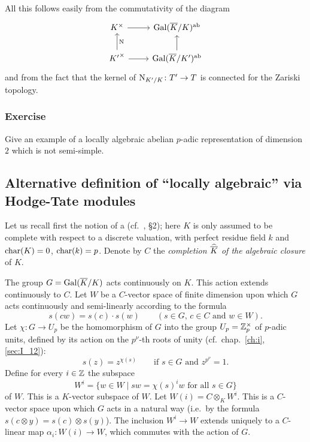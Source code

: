 All this follows easily from the commutativity of the diagram
\dpage
\[\begin{tikzcd}
	{K^\times} & {\abcl{\Gal(\algcl K/K)}} \\
	{{K'}^\times} & {\abcl{\Gal(\algcl K/K')}}
	\arrow[from=1-1, to=1-2]
	\arrow["\Nm"', from=2-1, to=1-1]
	\arrow[from=2-1, to=2-2]
	\arrow[from=2-2, to=1-2]
\end{tikzcd}\]
and from the fact that the kernel of $\operatorname{N}_{K'/K} \colon T' \to T$ is connected
for the Zariski topology.

\subsubsection*{Exercise}
Give an example of a locally algebraic abelian $p$-adic representation of
dimension $2$ which is not semi-simple.

\subsection{Alternative definition of ``locally algebraic'' via Hodge-Tate
modules}
\label{sec:III_12}
Let us recall first the notion of a  (cf.\ \cite{27},
\S 2); here $K$ is only assumed to be complete with respect to a discrete
valuation, with perfect residue field $k$ and $\operatorname{char}(K) = 0$, $\operatorname{char}(k) = p$.
Denote by $C$ the \emph{completion $\widehat{\overline{K}}$ of the algebraic
closure} of $K$.

The group $G = \operatorname{Gal}(\overline{K}/K)$ acts continuously on $K$. This action extends
continuously to $C$. Let $W$ be a $C$-vector space of finite dimension upon
which $G$ acts continuously and semi-linearly according to the formula
\[
	s(cw) = s(c) \cdot s(w) \qquad
	(s \in G, \, c \in C \text{ and } w \in W).
\]
Let $\chi\colon G \to U_p$ be the homomorphism of $G$ into the group $U_p =
\mathbb{Z}_p^\times$ of $p$-adic units, defined by its action on the $p^\nu$-th roots
of unity (cf.\ chap.~\ref{ch:i}, \ref{sec:I_12}):
\dpage
\[
	s(z) = z^{\chi(s)} \qquad \text{if } s \in G \text{ and } z^{p^\nu} = 1.
\]
Define for every $i \in \mathbb{Z}$ the subspace
\[
	W^i = \{ w \in W \mid sw = \chi(s)^i w \text{ for all } s\in G \}
\]
of $W$. This is a $K$-vector subspace of $W$. Let $W(i) = C \otimes_K W^i$.
This is a $C$-vector space upon which $G$ acts in a natural way (i.e.\ by the
formula $s(c \otimes y) = s(c) \otimes s(y)$). The inclusion $W^i \to W$
extends uniquely to a $C$-linear map $\alpha_i\colon W(i) \to W$, which
commutes with the action of $G$.

